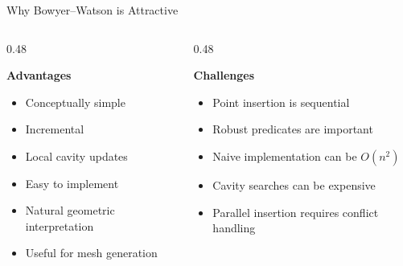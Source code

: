 \documentclass[aspectratio=169]{beamer}
\begin{document}
\begin{frame}{Why Bowyer--Watson is Attractive}

\begin{columns}

\begin{column}{0.48\textwidth}

\textbf{Advantages}

\begin{itemize}
    \item Conceptually simple
    \item Incremental
    \item Local cavity updates
    \item Easy to implement
    \item Natural geometric interpretation
    \item Useful for mesh generation
\end{itemize}
\end{column}
\begin{column}{0.48\textwidth}

\textbf{Challenges}

\begin{itemize}
    \item Point insertion is sequential
    \item Robust predicates are important
    \item Naive implementation can be $O(n^2)$
    \item Cavity searches can be expensive
    \item Parallel insertion requires conflict handling
\end{itemize}
\end{column}
\end{columns}

\end{frame}
\end{document}

